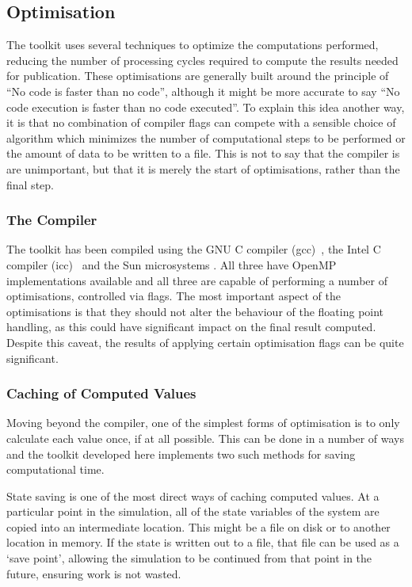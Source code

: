 \subsection{Optimisation}

The toolkit uses several techniques to optimize the computations performed,
reducing the number of processing cycles required to compute the results needed
for publication.  These optimisations are generally built around the principle
of ``No code is faster than no code'', although it might be more accurate to say
``No code execution is faster than no code executed''.  To explain this idea
another way, it is that no combination of compiler flags can compete with a
sensible choice of algorithm which minimizes the number of computational steps
to be performed or the amount of data to be written to a file.  This is not to
say that the compiler is are unimportant, but that it is merely the start of
optimisations, rather than the final step.

\subsubsection{The Compiler}

The toolkit has been compiled using the GNU C compiler (gcc)~\cite{gcc}, the
Intel C compiler (icc)~\cite{icc} and the Sun microsystems .  All three have
OpenMP implementations available and all three are capable of performing a
number of optimisations, controlled via flags.  The most important aspect of the
optimisations is that they should not alter the behaviour of the floating point
handling, as this could have significant impact on the final result computed.
Despite this caveat, the results of applying certain optimisation flags can be
quite significant.

\subsubsection{Caching of Computed Values}

Moving beyond the compiler, one of the simplest forms of optimisation is to only
calculate each value once, if at all possible.  This can be done in a number of
ways and the toolkit developed here implements two such methods for saving
computational time.

State saving is one of the most direct ways of caching computed values.  At a
particular point in the simulation, all of the state variables of the
system are copied into an intermediate location.  This might be a file on disk or
to another location in memory.  If the state is written out to a file, that file can
be used as a `save point', allowing the simulation to be continued from that
point in the future, ensuring work is not wasted.

